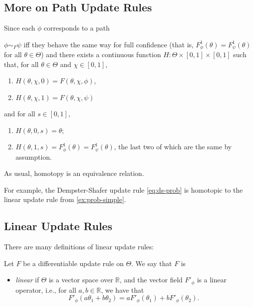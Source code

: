 \begin{subappendices}
    \subsection{More on Path Update Rules}
    Since each $\phi$ corresponds to a path

    \begin{defn}
    	$\phi \sim_F \psi$  iff 
    	they behave the same way for full confidence (that is, 
    	$F^1_{\phi}(\theta) = F^1_{\psi}(\theta)$ for all $\theta \in \Theta$)
    	and  there exists a continuous function
    	$H : \Theta \times [0,1] \times [0,1]$ such that,
    	for all $\theta \in \Theta$ and $\chi \in [0,1]$,
    	\begin{enumerate}[nosep]
    		\item $H(\theta, \chi, 0)= F(\theta, \chi, \phi)$,
    		\item $H(\theta, \chi, 1)= F(\theta, \chi, \psi)$
    	\end{enumerate}
    	and for all $s \in [0,1]$,
    	\begin{enumerate}
    		\item $H(\theta, 0, s) = \theta$;
    		\item $H(\theta, 1, s) = F^1_{\phi}(\theta) = F^1_{\psi}(\theta)$,
    		the last two of	which are the same by assumption. \qedhere
    	\end{enumerate}
    \end{defn}

    As usual, homotopy is an equivalence relation.

    For example, the Dempster-Shafer update rule \eqref{eq:ds-prob} is homotopic 
    to the linear update rule from \cref{ex:prob-simple}. 

    \subsection{Linear Update Rules}


    There are many definitions of linear update rules:
    \begin{defn}\label{ax:linear}
    Let $F$ be a differentiable update rule on $\Theta$. We say that $F$ is \textellipsis
    \begin{itemize}
    \item \emph{linear} if $\Theta$ is a vector space over $\mathbb R$, and the
    vector field $F'_\phi$ is a linear operator, i.e., for all $a, b \in \mathbb R$, we have that
    \[ F'_\phi(a \theta_1 + b \theta_2) = a F'_\phi(\theta_1) + b F'_\phi(\theta_2). \]


\end{itemize}
\end{defn}
\end{subappendices}
